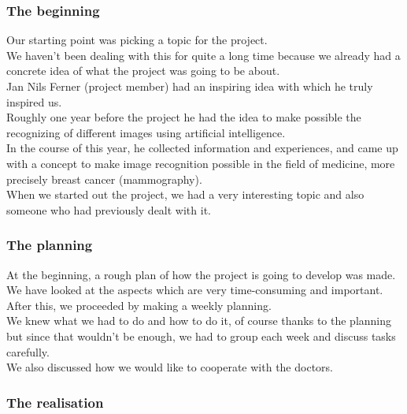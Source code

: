 \subsubsection{The beginning}

Our starting point was picking a topic for the project. \\
We haven't been dealing with this for quite a long time because we already had a concrete idea of what the project was going to be about. \\
Jan Nils Ferner (project member) had an inspiring idea with which he truly inspired us. \\ 
Roughly one year before the project he had the idea to make possible the recognizing of different images using artificial intelligence.\\ 
In the course of this year, he collected information and experiences, and came up with a concept to make image recognition possible in the field of medicine, more precisely breast cancer (mammography). \\
When we started out the project, we had a very interesting topic and also someone who had previously dealt with it.\\

\subsubsection{The planning}

 At the beginning, a rough plan of how the project is going to develop was made. \\
We have looked at the aspects which are very time-consuming and important. After this, we proceeded by making a weekly planning. \\
We knew what we had to do and how to do it, of course thanks to the planning but since that wouldn't be enough, we had to group each week and discuss tasks carefully.  \\
We also discussed how we would like to cooperate with the doctors.\\

\subsubsection{The realisation}

